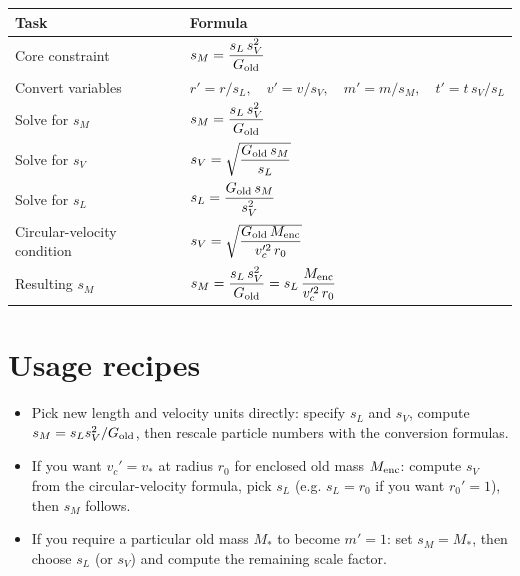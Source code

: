 \documentclass[11pt]{article}
\begin{document}
\begin{center}
\renewcommand{\arraystretch}{2}
\begin{tabular}{p{} p{}}
\hline
Task & Formula\\
\hline
  Core constraint & $s_M = \dfrac{s_L\,s_V^2}{G_{\rm old}}$ \\
  Convert variables & $r' = r/s_L,\quad v'=v/s_V,\quad m'=m/s_M,\quad t' = t\,s_V/s_L$ \\
  Solve for $s_M$ & $s_M = \dfrac{s_L\,s_V^2}{G_{\rm old}}$ \\
  Solve for $s_V$ & $s_V = \sqrt{\dfrac{G_{\rm old}\,s_M}{s_L}}$ \\
  Solve for $s_L$ & $s_L = \dfrac{G_{\rm old}\,s_M}{s_V^2}$ \\
  Circular-velocity condition & $s_V = \sqrt{\dfrac{G_{\rm old}\,M_{\rm enc}}{v_c'^2\,r_0}}$ \\
  Resulting $s_M$ & $s_M = \dfrac{s_L\,s_V^2}{G_{\rm old}} = s_L\,\dfrac{M_{\rm enc}}{v_c'^2\,r_0}$ \\
\hline
\end{tabular}
\end{center}

\section{Usage recipes}
\begin{itemize}
\item Pick new length and velocity units directly: specify \(s_L\) and
  \(s_V\), compute \(s_M = s_L s_V^2/G_{\rm old}\), then rescale
  particle numbers with the conversion formulas.
\item If you want \(v_c'=v_*\) at radius \(r_0\) for enclosed old mass
  \(M_{\rm enc}\): compute \(s_V\) from the circular-velocity formula,
  pick \(s_L\) (e.g. \(s_L=r_0\) if you want \(r_0'=1\)), then \(s_M\)
  follows.
\item If you require a particular old mass \(M_*\) to become \(m'=1\):
  set \(s_M=M_*\), then choose \(s_L\) (or \(s_V\)) and compute the
  remaining scale factor.
\end{itemize}
\end{document}
